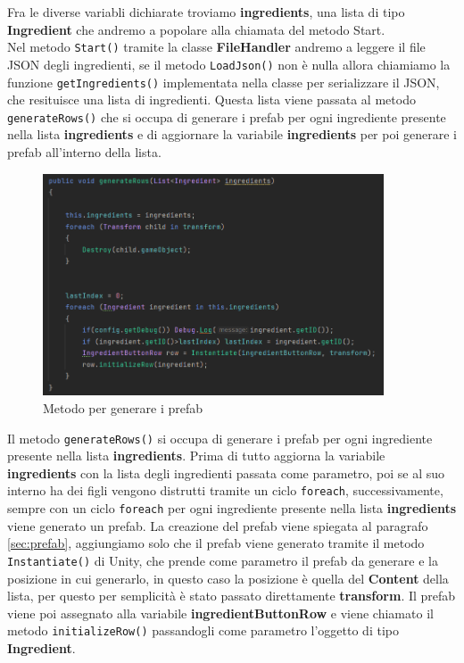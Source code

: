 Fra le diverse variabli dichiarate troviamo \textbf{ingredients}, una lista di tipo \textbf{Ingredient} che andremo a popolare alla chiamata del metodo Start. \\
Nel metodo \texttt{Start()} tramite la classe \textbf{FileHandler} andremo a leggere il file JSON degli ingredienti, se il metodo \texttt{LoadJson()} non è nulla allora chiamiamo la funzione \texttt{getIngredients()} implementata nella classe per serializzare il JSON, che resituisce una lista di ingredienti. Questa lista viene passata al metodo \texttt{generateRows()} che si occupa di  generare i prefab per ogni ingrediente presente nella lista \textbf{ingredients} e di aggiornare la variabile \textbf{ingredients} per poi generare i prefab all'interno della lista.
\begin{figure}[H]
    \centering
    \includegraphics[width=0.9\textwidth,height=\textheight,keepaspectratio]{figures/chapter_1/generateRows_CODICE.png}
    \caption{Metodo per generare i prefab}
    \label{fig:generateRows}
\end{figure}
Il metodo \texttt{generateRows()} si occupa di generare i prefab per ogni ingrediente presente nella lista \textbf{ingredients}. Prima di tutto aggiorna la variabile \textbf{ingredients} con la lista degli ingredienti passata come parametro, poi se al suo interno ha dei figli vengono distrutti tramite un ciclo \texttt{foreach}, successivamente, sempre con un ciclo \texttt{foreach} per ogni ingrediente presente nella lista \textbf{ingredients} viene generato un prefab. La creazione del prefab viene spiegata al paragrafo \ref{sec:prefab}, aggiungiamo solo che il prefab viene generato tramite il metodo \texttt{Instantiate()} di Unity, che prende come parametro il prefab da generare e la posizione in cui generarlo, in questo caso la posizione è quella del \textbf{Content} della lista, per questo per semplicità è stato passato direttamente \textbf{transform}. Il prefab viene poi assegnato alla variabile \textbf{ingredientButtonRow} e viene chiamato il metodo \texttt{initializeRow()} passandogli come parametro l'oggetto di tipo \textbf{Ingredient}.

